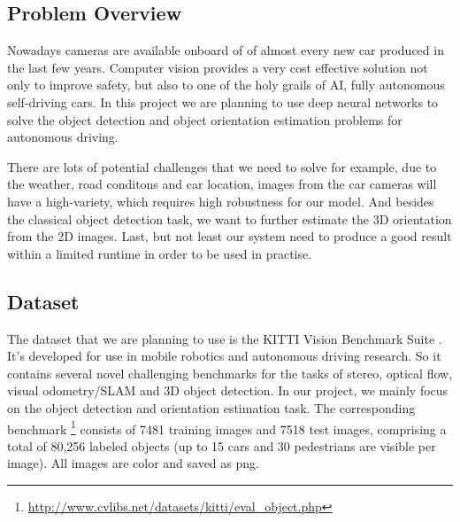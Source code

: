 \subsection{Problem Overview}


Nowadays cameras are available onboard of of almost every new car produced in the last few years. Computer vision provides a very cost effective solution not only to improve safety, but also to one of the holy grails of AI, fully autonomous self-driving cars. 
In this project we are planning to use deep neural networks to solve the object detection and object orientation estimation problems for autonomous driving. 

There are lots of potential challenges that we need to solve for example, 
due to the weather, road conditons and car location, 
images from the car cameras will have a high-variety, which 
requires high robustness for our model. 
And besides the classical object detection task, we 
want to further estimate the 3D orientation from the 2D images.
Last, but not least our 
system need to produce a good result within a limited runtime in order 
to be used in practise.

\subsection{Dataset}
The dataset that we are planning to use is the KITTI Vision Benchmark Suite \cite{Geiger2012CVPR}.  
It's developed for use in mobile robotics and autonomous driving research. So it 
contains several novel challenging benchmarks for the tasks of stereo, optical flow, visual
odometry/SLAM and 3D object detection. 
In our project, we mainly focus on the object detection and orientation estimation task. 
The corresponding benchmark \footnote{\url{http://www.cvlibs.net/datasets/kitti/eval_object.php}} consists of 7481 training images and 7518 test images, comprising a total of 80,256 labeled objects (up to 15 cars and 30 pedestrians are visible per image). All images are color and saved as png.

